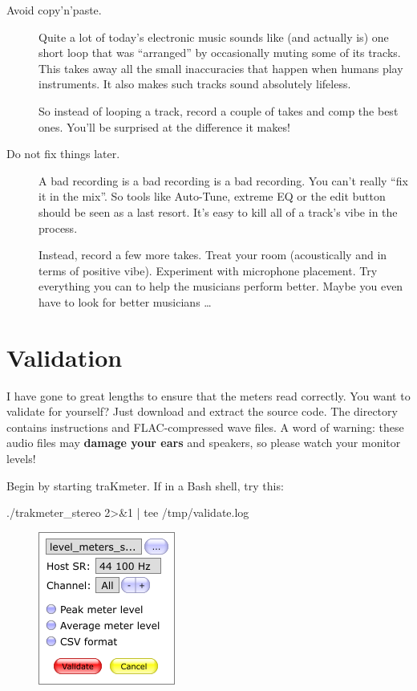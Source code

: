 \begin{description}
\item[Avoid copy'n'paste.]  Quite a lot of today's electronic music
  sounds like (and actually is) one short loop that was ``arranged''
  by occasionally muting some of its tracks.  This takes away all the
  small inaccuracies that happen when humans play instruments.  It
  also makes such tracks sound absolutely lifeless.

  So instead of looping a track, record a couple of takes and comp the
  best ones.  You'll be surprised at the difference it makes!

\item[Do not fix things later.]  A bad recording is a bad recording is
  a bad recording.  You can't really ``fix it in the mix''.  So tools
  like Auto-Tune, extreme EQ or the edit button should be seen as a
  last resort.  It's easy to kill all of a track's vibe in the
  process.

  Instead, record a few more takes.  Treat your room (acoustically and
  in terms of positive vibe).  Experiment with microphone placement.
  Try everything you can to help the musicians perform better.  Maybe
  you even have to look for better musicians \dots

\end{description}

\chapter{Validation}
\label{chap:validation}

I have gone to great lengths to ensure that the meters read correctly.
You want to validate for yourself?  Just download and extract the
source code.  The directory  contains instructions
and FLAC-compressed wave files.  A word of warning: these audio files
may \textbf{damage your ears} and speakers, so please watch your
monitor levels!

Begin by starting traKmeter.  If in a Bash shell, try this:

\begin{VerbatimBoth}
  ./trakmeter_stereo 2>&1 | tee /tmp/validate.log
\end{VerbatimBoth}

\begin{figure}
\includegraphics[scale=0.60,clip]{include/images/dialog_validation.png}
\end{figure}

